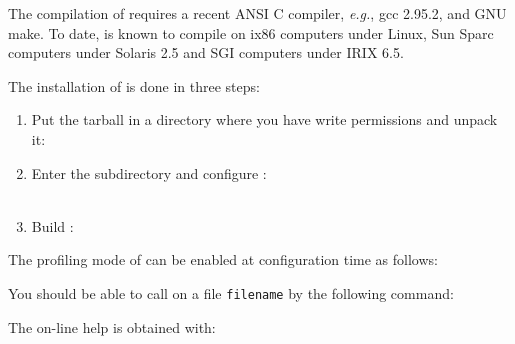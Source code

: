 \vspace*{-3mm}



The compilation of \Softname{} requires a recent ANSI C compiler,
\emph{e.g.}, gcc 2.95.2, and GNU make. To date, \Softname{} is known to
compile on ix86 computers under Linux, Sun Sparc computers under
Solaris 2.5 and SGI computers under IRIX 6.5.




The installation of \Softname{} is done in three steps:
%
\begin{enumerate}
\item Put the tarball in a directory where you have write permissions
and unpack it:\\
%

\item Enter the subdirectory and configure \Softname{}:\\
%
\\


\item Build \Softname{}:\\
%
\end{enumerate}

\noindent The profiling mode of \Softname{} can be enabled at configuration time as follows:\\
%




You should be able to call \Softname{} on a file \texttt{filename} by
the following command:\\

The on-line help is obtained with:\\


